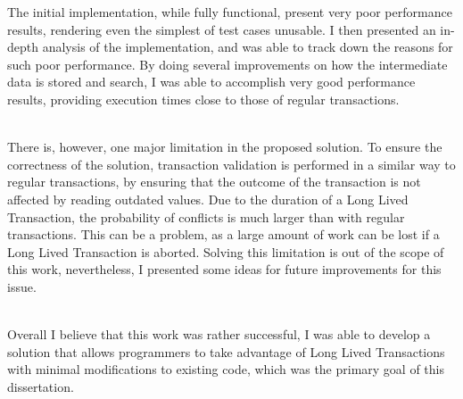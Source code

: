 The initial implementation, while fully functional, present very poor
performance results, rendering even the simplest of test cases
unusable. I then presented an in-depth analysis of the implementation,
and was able to track down the reasons for such poor performance. By
doing several improvements on how the intermediate data is stored and
search, I was able to accomplish very good performance results,
providing execution times close to those of regular transactions.

~\\

There is, however, one major limitation in the proposed solution. To
ensure the correctness of the solution, transaction validation is
performed in a similar way to regular transactions, by ensuring that
the outcome of the transaction is not affected by reading outdated
values. Due to the duration of a Long Lived Transaction, the
probability of conflicts is much larger than with regular
transactions. This can be a problem, as a large amount of work can be
lost if a Long Lived Transaction is aborted. Solving this limitation
is out of the scope of this work, nevertheless, I presented some ideas
for future improvements for this issue.

~\\

Overall I believe that this work was rather successful, I was able to
develop a solution that allows programmers to take advantage of Long
Lived Transactions with minimal modifications to existing code, which
was the primary goal of this dissertation.